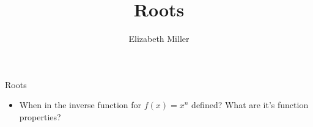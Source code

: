 \documentclass{ximera}
\author{Elizabeth Miller}
\title{Roots}
\begin{document}
\begin{abstract}
\end{abstract}
\maketitle


\begin{objectives}

\item Roots
\begin{itemize}
	\item When in the inverse function for $f(x)=x^n$ defined?  What are it's function properties?
\end{itemize}




\end{objectives}
\end{document}

